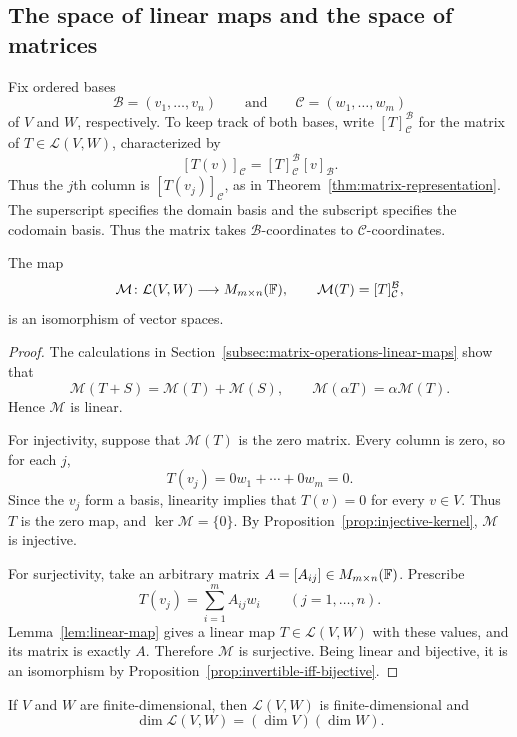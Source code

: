 \subsection{The space of linear maps and the space of matrices}

Fix ordered bases
\[
  \mathcal B=(v_1,\ldots,v_n)
  \qquad\text{and}\qquad
  \mathcal C=(w_1,\ldots,w_m)
\]
of $V$ and $W$, respectively. To keep track of both bases, write
$[T]_{\mathcal C}^{\mathcal B}$ for the matrix of
$T\in\mathcal L(V,W)$, characterized by
\[
  [T(v)]_{\mathcal C}
    =[T]_{\mathcal C}^{\mathcal B}[v]_{\mathcal B}.
\]
Thus the $j$th column is $[T(v_j)]_{\mathcal C}$, as in
Theorem~\ref{thm:matrix-representation}. The superscript specifies the domain basis and the subscript specifies
the codomain basis. Thus the matrix takes $\mathcal B$-coordinates to
$\mathcal C$-coordinates.

\begin{proposition}\label{prop:matrix-map-isomorphism}
  The map
  \[
    \mathcal M\colon\mathcal L(V,W)\longrightarrow M_{m\times n}(\mathbb{F}),
    \qquad \mathcal M(T)=[T]_{\mathcal C}^{\mathcal B},
  \]
  is an isomorphism of vector spaces.
\end{proposition}

\begin{proof}
  The calculations in
  Section~\ref{subsec:matrix-operations-linear-maps} show that
  \[
    \mathcal M(T+S)=\mathcal M(T)+\mathcal M(S),
    \qquad
    \mathcal M(\alpha T)=\alpha\mathcal M(T).
  \]
  Hence $\mathcal M$ is linear.

  For injectivity, suppose that $\mathcal M(T)$ is the zero matrix.
  Every column is zero, so for each $j$,
  \[
    T(v_j)=0w_1+\cdots+0w_m=0.
  \]
  Since the $v_j$ form a basis, linearity implies that $T(v)=0$ for
  every $v\in V$. Thus $T$ is the zero map, and
  $\ker\mathcal M=\{0\}$. By
  Proposition~\ref{prop:injective-kernel}, $\mathcal M$ is injective.

  For surjectivity, take an arbitrary matrix
  $A=[A_{ij}]\in M_{m\times n}(\mathbb{F})$. Prescribe
  \[
    T(v_j)=\sum_{i=1}^m A_{ij}w_i
    \qquad (j=1,\ldots,n).
  \]
  Lemma~\ref{lem:linear-map} gives a linear map $T\in\mathcal L(V,W)$
  with these values, and its matrix is exactly $A$. Therefore
  $\mathcal M$ is surjective. Being linear and bijective, it is an
  isomorphism by Proposition~\ref{prop:invertible-iff-bijective}.
\end{proof}

\begin{corollary}\label{cor:dimension-linear-maps}
  If $V$ and $W$ are finite-dimensional, then $\mathcal L(V,W)$ is
  finite-dimensional and
  \[
    \dim\mathcal L(V,W)=(\dim V)(\dim W).
  \]
\end{corollary}

